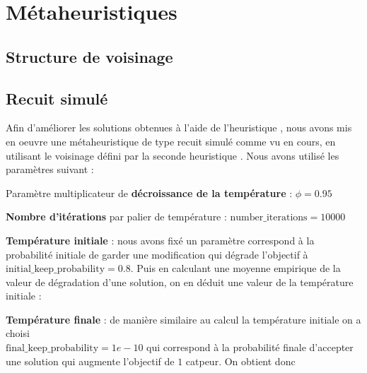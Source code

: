 \documentclass[12pt]{article}
\begin{document}
\section{Métaheuristiques}

\subsection{Structure de voisinage}

\subsection{Recuit simulé}

Afin d'améliorer les solutions obtenues à l'aide de l'heuristique , nous avons mis en oeuvre une métaheuristique de type recuit simulé comme vu en cours, en utilisant le voisinage défini par la seconde heuristique . Nous avons utilisé les paramètres suivant :

\begin{bulletlist}
  \item Paramètre multiplicateur de \textbf{décroissance de la température} : $\phi=0.95$
  \item \textbf{Nombre d'itérations} par palier de température : $\text{number\_iterations} = 10000$
  \item \textbf{Température initiale} : nous avons fixé un paramètre correspond à la probabilité initiale de garder une modification qui dégrade l'objectif à $\text{initial\_keep\_probability} = 0.8$. Puis en calculant une moyenne empirique de la valeur de dégradation d'une solution, on en déduit une valeur de la température initiale : 
  \item \textbf{Température finale} : de manière similaire au calcul la température initiale on a choisi\\ $\text{final\_keep\_probability} = 1e-10$ qui correspond à la probabilité finale d'accepter une solution qui augmente l'objectif de $1$ catpeur. On obtient donc 
\end{bulletlist}
\end{document}
